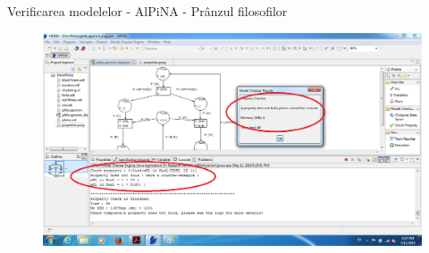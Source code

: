 \documentclass{beamer}
\begin{document}
\begin{frame}{Verificarea modelelor - AlPiNA - Prânzul filosofilor}
\begin{figure}
\centering
\includegraphics[scale=0.32]{images/alpina8}
\end{figure}
\end{frame}
\end{document}
